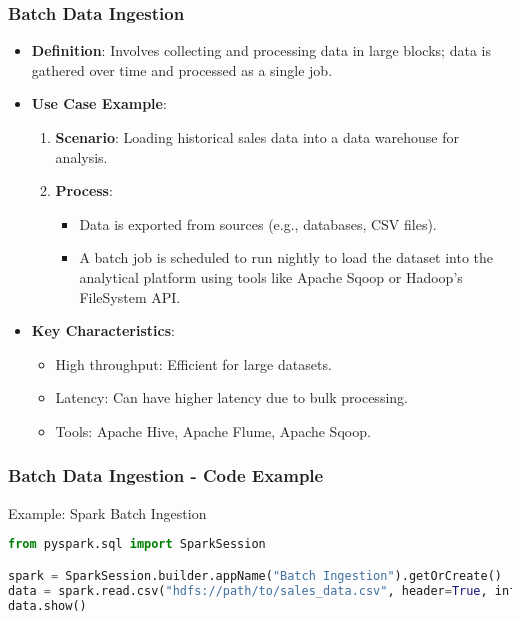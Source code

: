 \documentclass[aspectratio=169]{beamer}
\begin{document}
\begin{frame}
    \frametitle{Batch Data Ingestion}
    \begin{itemize}
        \item \textbf{Definition}: Involves collecting and processing data in large blocks; data is gathered over time and processed as a single job.
        
        \item \textbf{Use Case Example}:
            \begin{enumerate}
                \item \textbf{Scenario}: Loading historical sales data into a data warehouse for analysis.
                \item \textbf{Process}:
                    \begin{itemize}
                        \item Data is exported from sources (e.g., databases, CSV files).
                        \item A batch job is scheduled to run nightly to load the dataset into the analytical platform using tools like Apache Sqoop or Hadoop’s FileSystem API.
                    \end{itemize}
            \end{enumerate}
        
        \item \textbf{Key Characteristics}:
            \begin{itemize}
                \item High throughput: Efficient for large datasets.
                \item Latency: Can have higher latency due to bulk processing.
                \item Tools: Apache Hive, Apache Flume, Apache Sqoop.
            \end{itemize}
    \end{itemize}
\end{frame}

\begin{frame}[fragile]
    \frametitle{Batch Data Ingestion - Code Example}
    \begin{block}{Example: Spark Batch Ingestion}
        \begin{lstlisting}[language=python]
from pyspark.sql import SparkSession

spark = SparkSession.builder.appName("Batch Ingestion").getOrCreate()
data = spark.read.csv("hdfs://path/to/sales_data.csv", header=True, inferSchema=True)
data.show()
        \end{lstlisting}
    \end{block}
\end{frame}
\end{document}
